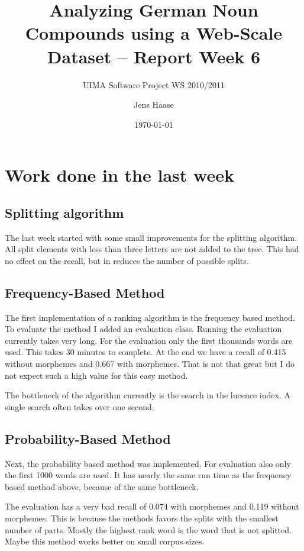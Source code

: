 \documentclass[11pt, accentcolor=tud9b, nochapname]{tudexercise}
\begin{document}
\author{Jens Haase}
\title{Analyzing German Noun Compounds using a
  Web-Scale Dataset -- Report Week 6}
\subtitle{UIMA Software Project WS 2010/2011}
\date{\today}
\maketitle

\section{Work done in the last week}

\subsection{Splitting algorithm}
The last week started with some small improvements for the splitting algorithm. All split elements with less than three letters are not added to the tree. This had no effect on the recall, but in reduces the number of possible splits.

\subsection{Frequency-Based Method}
The first implementation of a ranking algorithm is the frequency based method. To evaluate the method I added an evaluation class. Running the evaluation currently takes very long. For the evaluation only the first thousands words are used. This takes 30 minutes to complete. At the end we have a recall of 0.415 without morphemes and 0.667 with morphemes. That is not that great but I do not expect such a high value for this easy method.

The bottleneck of the algorithm currently is the search in the lucence index. A single search often takes over one second.

\subsection{Probability-Based Method}
Next, the probability based method was implemented. For evaluation also only the first 1000 words are used. It has nearly the same run time as the frequency based method above, because of the same bottleneck.

The evaluation has a very bad recall of 0.074 with morphemes and 0.119 without morphemes. This is because the methods favors the splits with the smallest number of parts. Mostly the highest rank word is the word that is not splitted. Maybe this method works better on small corpus sizes.
\end{document}

